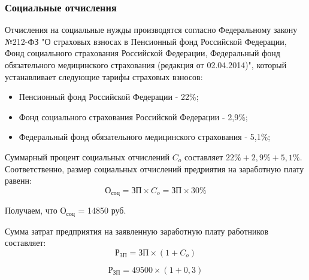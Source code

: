 \documentclass[a4paper]{extarticle}
\numberwithin{equation}{section}
\begin{document}
\subsubsection{Социальные отчисления}
Отчисления на социальные нужды производятся согласно Федеральному закону №212-ФЗ "О страховых взносах в Пенсионный фонд Российской Федерации, Фонд социального страхования Российской Федерации, Федеральный фонд обязательного медицинского страхования (редакция от 02.04.2014)", который устанавливает следующие тарифы страховых взносов:
\begin{itemize}
  \item Пенсионный фонд Российской Федерации - 22\%;
  \item Фонд социального страхования Российской Федерации - 2,9\%;
  \item Федеральный фонд обязательного медицинского страхования - 5,1\%;
\end{itemize}\par
Суммарный процент социальных отчислений $C_o$ составляет $22\% + 2,9\% + 5,1\%$. Соответственно, размер социальных отчислений предриятия на заработную плату равенн:
\begin{equation}
\label{form3}
	\text{О}_\text{соц} = \text{ЗП}\times C_o = \text{ЗП}\times 30\%
\end{equation}\par
Получаем, что $\text{О}_\text{соц}$ = 14850 руб.\par
Сумма затрат предприятия на заявленную заработную плату работников составляет:
\begin{equation}
\label{form4}
	\text{Р}_\text{ЗП}=\text{ЗП}\times(1+C_o)
\end{equation}

\begin{equation}
\label{form5}
	\text{Р}_\text{ЗП}=49500\times(1+0,3)
\end{equation}\par
\end{document}
